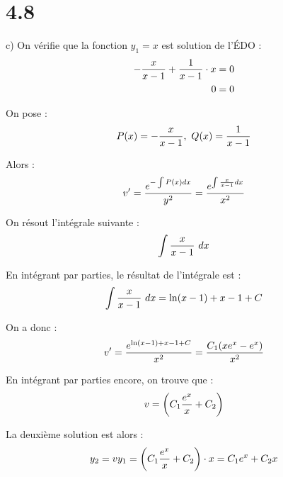 \section*{4.8}

c) On vérifie que la fonction $y_1 = x$ est solution de l'ÉDO :
\begin{align*}
    -\dfrac{x}{x-1} + \dfrac{1}{x-1}\cdot x &= 0 \\
    0 &= 0
\end{align*}

On pose :
\begin{align*}
    P(x) = -\dfrac{x}{x-1},\ Q(x) = \dfrac{1}{x-1}
\end{align*}

Alors :
\begin{align*}
    v' = \dfrac{e^{-\int{P(x)dx}}}{y^2} = \dfrac{e^{\int{\frac{x}{x-1}dx}}}{x^2}
\end{align*}

On résout l'intégrale suivante :
\begin{align*}
    \int{\dfrac{x}{x-1}\ dx}
\end{align*}

En intégrant par parties, le résultat de l'intégrale est :
\begin{align*}
    \int{\dfrac{x}{x-1}\ dx} = \ln(x-1) + x - 1 + C
\end{align*}

On a donc :
\begin{align*}
    v' = \dfrac{e^{\ln(x-1)+x-1+C}}{x^2} = \dfrac{C_1(xe^x - e^x)}{x^2}
\end{align*}

En intégrant par parties encore, on trouve que :
\begin{align*}
    v = \left({C_1 \dfrac{e^x}{x} + C_2}\right)
\end{align*}

La deuxième solution est alors :
\begin{align*}
    y_2 = vy_1 = \left({C_1 \dfrac{e^x}{x} + C_2}\right)\cdot x = C_1 e^x + C_2 x
\end{align*}
